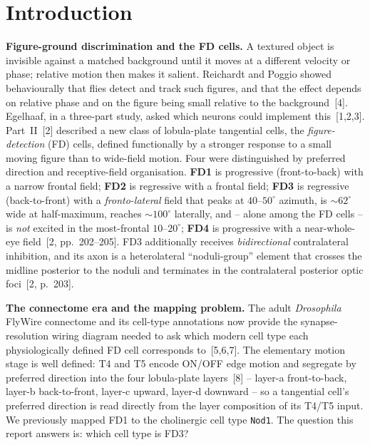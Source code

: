 \documentclass[11pt]{article}
\newcommand{\ttt}[1]{\texttt{#1}}
\begin{document}
\section{Introduction}

\textbf{Figure-ground discrimination and the FD cells.}\quad
A textured object is invisible against a matched background until it moves at a different
velocity or phase; relative motion then makes it salient. Reichardt and Poggio showed
behaviourally that flies detect and track such figures, and that the effect depends on relative
phase and on the figure being small relative to the background~[4]. Egelhaaf, in a three-part
study, asked which neurons could implement this~[1,2,3]. Part~II~[2] described a new class of
lobula-plate tangential cells, the \emph{figure-detection} (FD) cells, defined functionally by a
stronger response to a small moving figure than to wide-field motion. Four were distinguished by
preferred direction and receptive-field organisation. \textbf{FD1} is progressive
(front-to-back) with a narrow frontal field; \textbf{FD2} is regressive with a frontal field;
\textbf{FD3} is regressive (back-to-front) with a \emph{fronto-lateral} field that peaks at
$40$--$50^\circ$ azimuth, is $\sim$$62^\circ$ wide at half-maximum, reaches $\sim$$100^\circ$
laterally, and -- alone among the FD cells -- is \emph{not} excited in the most-frontal
$10$--$20^\circ$; \textbf{FD4} is progressive with a near-whole-eye field~[2, pp.~202--205].
FD3 additionally receives \emph{bidirectional} contralateral inhibition, and its axon is a
heterolateral ``noduli-group'' element that crosses the midline posterior to the noduli and
terminates in the contralateral posterior optic foci~[2, p.~203].

\textbf{The connectome era and the mapping problem.}\quad
The adult \emph{Drosophila} FlyWire connectome and its cell-type annotations now provide the
synapse-resolution wiring diagram needed to ask which modern cell type each physiologically
defined FD cell corresponds to~[5,6,7]. The elementary motion stage is well defined: T4 and T5
encode ON/OFF edge motion and segregate by preferred direction into the four lobula-plate
layers~[8] -- layer-a front-to-back, layer-b back-to-front, layer-c upward, layer-d downward --
so a tangential cell's preferred direction is read directly from the layer composition of its
T4/T5 input. We previously mapped FD1 to the cholinergic cell type \ttt{Nod1}. The question this
report answers is: which cell type is FD3?
\end{document}
